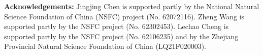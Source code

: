 \documentclass[letterpaper]{article}
\begin{document}
\hspace*{\fill}

\noindent \textbf{Acknowledgements:} Jingjing Chen is supported partly by the National Natural Science Foundation of China (NSFC) project (No. 62072116). Zheng Wang is supported partly by the NSFC project (No. 62302453). Lechao Cheng is supported partly by the NSFC project (No. 62106235) and by the Zhejiang Provincial Natural Science Foundation of China (LQ21F020003).



%
\end{document}
